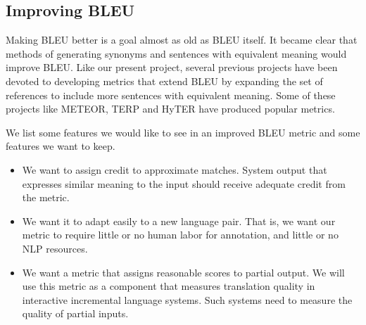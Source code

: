 \subsection{Improving BLEU}
\label{sec:improvebleu}



Making BLEU better is a goal almost as old as BLEU itself. 
It became clear that  methods of generating synonyms and sentences with equivalent meaning would improve  BLEU. 
Like our present project, several previous projects have been devoted to developing metrics that extend BLEU by expanding the set of references to include more sentences with equivalent meaning. 
Some of these projects like METEOR\cite{banerjee-lavie:2005:MTSumm}\cite{denkowski:lavie:meteor-wmt:2014}, TERP\cite{snover-06}\cite{snover-08} and HyTER have produced popular metrics. 


We list some features we would like to see in an improved BLEU metric and some features we want to keep.  
\begin{itemize}
\item 
We want to assign credit to approximate matches. 
System output that expresses similar meaning to the input should receive adequate credit from the metric. 
\item 
We want  it to adapt easily to a new language pair. 
That is, we want our metric to require little or no human labor for annotation, and little or no NLP resources. 

\item 
We want a metric that assigns reasonable scores to partial output. 
We  will use this metric as a component that measures translation quality in interactive incremental language systems. 
Such systems need to measure the quality of partial inputs. 
\end{itemize}

